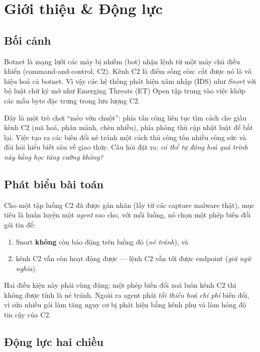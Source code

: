 \documentclass[12pt,a4paper]{report}
\newcommand{\Snort}{\textit{Snort}}
\begin{document}
\chapter{Giới thiệu \& Động lực}
\label{ch:intro}

\section{Bối cảnh}

Botnet là mạng lưới các máy bị nhiễm (bot) nhận lệnh từ một máy chủ điều khiển
(command-and-control, C2). Kênh C2 là điểm sống còn: cắt được nó là vô hiệu hoá cả
botnet. Vì vậy các hệ thống phát hiện xâm nhập (IDS) như \Snort{} \citep{snort_project}
với bộ luật chữ ký mở như Emerging Threats (ET) Open \citep{emerging_threats} tập
trung vào việc khớp các mẫu byte đặc trưng trong lưu lượng C2.

Đây là một trò chơi ``mèo vờn chuột'': phía tấn công liên tục tìm cách che giấu kênh
C2 (mã hoá, phân mảnh, chèn nhiễu), phía phòng thủ cập nhật luật để bắt lại. Việc tạo
ra các biến đổi né tránh một cách thủ công tốn nhiều công sức và đòi hỏi hiểu biết sâu
về giao thức. Câu hỏi đặt ra: \emph{có thể tự động hoá quá trình này bằng học tăng
cường không?}

\section{Phát biểu bài toán}

Cho một tập luồng C2 đã được gán nhãn (lấy từ các capture malware thật), mục tiêu là
huấn luyện một \emph{agent} sao cho, với mỗi luồng, nó chọn một phép biến đổi gói tin
để:

\begin{enumerate}[label=(\arabic*)]
  \item Snort \textbf{không} còn báo động trên luồng đó (\emph{né tránh}), và
  \item kênh C2 vẫn còn hoạt động được — lệnh C2 vẫn tới được endpoint
        (\emph{giữ ngữ nghĩa}).
\end{enumerate}

Hai điều kiện này phải cùng đúng; một phép biến đổi xoá luôn kênh C2 thì không được
tính là né tránh. Ngoài ra agent phải \emph{tối thiểu hoá chi phí} biến đổi, vì sửa
nhiều gói làm tăng nguy cơ bị phát hiện bằng kênh phụ và làm hỏng độ tin cậy của C2.

\section{Động lực hai chiều}
\end{document}

